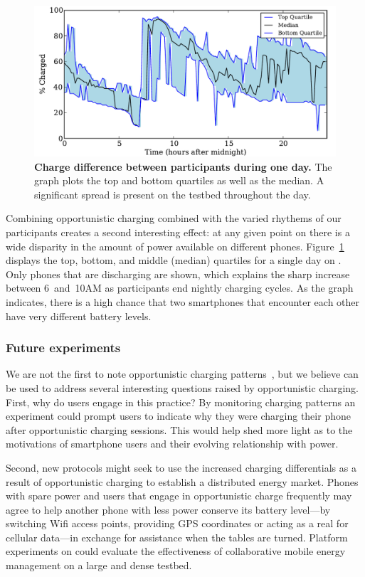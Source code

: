 \begin{figure}[t]
\includegraphics[width=\textwidth]{./figures/power/opportunistic_charging/max_difference/graph.pdf}
\caption{\textbf{Charge difference between participants during one day.} The
graph plots the top and bottom quartiles as well as the median. A significant
spread is present on the testbed throughout the day.}
\label{fig-opportunisticspread}
\end{figure}

Combining opportunistic charging combined with the varied rhythems of our
participants creates a second interesting effect: at any given point on
\PhoneLab{} there is a wide disparity in the amount of power available on
different phones. Figure~\ref{fig-opportunisticspread} displays the top,
bottom, and middle (median) quartiles for a single day on \PhoneLab{}. Only
phones that are discharging are shown, which explains the sharp increase
between 6~and~10AM as participants end nightly charging cycles.  As the graph
indicates, there is a high chance that two smartphones that encounter each
other have very different battery levels.

\subsubsection{Future experiments}

We are not the first to note opportunistic charging
patterns~\cite{banerjee:ubicomp:2007, rahmati:mobilehci:2007}, but we believe
\PhoneLab{} can be used to address several interesting questions raised by
opportunistic charging. First, why do users engage in this practice? By
monitoring charging patterns an experiment could prompt users to indicate why
they were charging their phone after opportunistic charging sessions. This
would help shed more light as to the motivations of smartphone users and
their evolving relationship with power.

Second, new protocols might seek to use the increased charging differentials
as a result of opportunistic charging to establish a distributed energy
market. Phones with spare power and users that engage in opportunistic charge
frequently may agree to help another phone with less power conserve its
battery level---by switching Wifi access points, providing GPS coordinates or
acting as a real for cellular data---in exchange for assistance when the
tables are turned. Platform experiments on \PhoneLab{} could evaluate the
effectiveness of collaborative mobile energy management on a large and dense
testbed.
